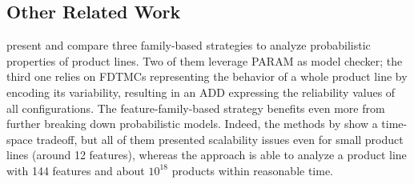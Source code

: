 



\subsection{Other Related Work}

\citet{rodrigues_modeling_2015} present and compare three family-based
strategies to analyze probabilistic properties of product lines. Two of them
leverage PARAM as model checker; the third one relies on FDTMCs representing the
behavior of a whole product line by encoding its variability, resulting in an
ADD expressing the reliability values of all configurations. The 
feature-family-based strategy benefits even more from further breaking down
probabilistic models. Indeed, the methods by
\citeauthor{rodrigues_modeling_2015} show a time-space tradeoff, but all of them
presented scalability issues even for small product lines (around 12 features),
whereas the approach is able to analyze a product line with 144 features and
about $10^{18}$ products within reasonable time.



